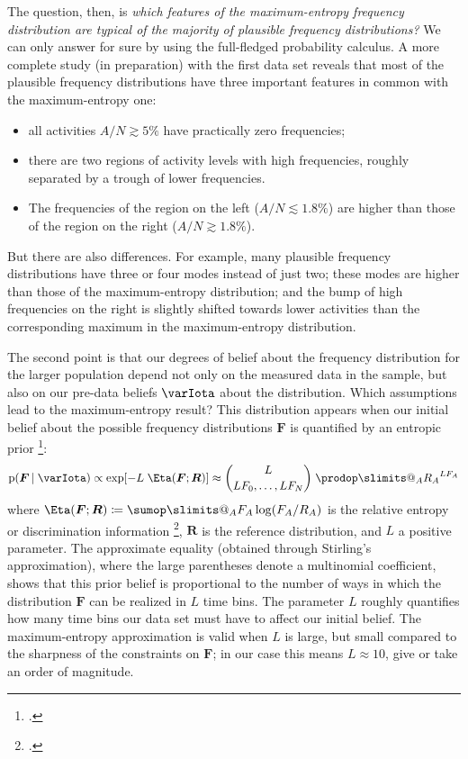 \documentclass[\ifafour a4paper,12pt,\else a5paper,10pt,\fi%
onecolumn,oneside,article,%
british%
]{memoir}
\makeatletter
\theoremstyle{remark}
\theoremstyle{innote}
\def\sum{\DOTSI\sumop\slimits@}
\def\prod{\DOTSI\prodop\slimits@}
\newcommand*{\citep}{\footcites}
\newcommand*{\defd}{\coloneqq}
\newcommand*{\pf}{\mathrm{p}}%
\renewcommand*{\|}{\nonscript\,\vert\nonscript\;\mathopen{}}
\newcommand*{\yAv}{A}
\newcommand*{\yFF}{F}
\newcommand*{\yF}{\bm{\yFF}}
\newcommand*{\yA}{\yAv}%
\newcommand*{\yI}{\varIota}
\newcommand*{\re}{\Eta}
\newcommand*{\yRR}{R}
\newcommand*{\yR}{\bm{\yRR}}
\newcommand*{\yL}{L}
\makeatother
\begin{document}
The question, then, is \emph{which features of the maximum-entropy
  frequency distribution are typical of the majority of plausible frequency
  distributions?} We can only answer for sure by using the full-fledged
probability calculus. A more complete study (in preparation) with the first
data set reveals that most of the plausible frequency distributions have
three important features in common with the maximum-entropy one:
\begin{itemize}
\item all activities $\yA/N \gtrsim 5\%$ have practically zero frequencies;
\item there are two regions of activity levels with high frequencies,
  roughly separated by a trough of lower frequencies.
\item The frequencies of the region on the left ($\yA/N \lesssim 1.8\%$)
  are higher than those of the region on the right ($\yA/N \gtrsim 1.8\%$).
\end{itemize}
But there are also differences. For example, many plausible frequency
distributions have three or four modes instead of just two; these modes are
higher than those of the maximum-entropy distribution; and the bump of high
frequencies on the right is slightly shifted towards lower activities than
the corresponding maximum in the maximum-entropy distribution.

\medskip

The second point is that our degrees of belief about the frequency
distribution for the larger population depend not only on the measured data in
the sample, but also on our pre-data beliefs $\yI$ about the distribution.
Which assumptions lead to the maximum-entropy result? This distribution
appears when our initial belief about the possible frequency distributions
$\yF$ is quantified by an entropic prior
\citep{neumann2007,rodriguez1991,skilling1998,catichaetal2004,portamana2017}:
\begin{equation}
  \label{eq:entropic_prior}
  \pf(\yF \| \yI) \propto  \exp[-\yL\;\re(\yF;\yR)]
  \approx \binom{L}{L\yFF_{0}, \dotsc, L\yFF_{N}}\;
  \prod_{\yA}{\yRR_{\yA}}^{L\yFF_{\yA}}
\end{equation}
where $\re(\yF;\yR)\defd \sum_{\yA}\yFF_{\yA}\log(\yFF_{\yA}/\yRR_{\yA})$ is
the relative entropy or discrimination information
\citep{kullback1987,jaynes1963,hobson1969,hobsonetal1973}, $\yR$ is the
reference distribution, and $\yL$ a positive parameter. The approximate
equality (obtained through Stirling's approximation), where the large
parentheses denote a multinomial coefficient, shows that this prior belief
is proportional to the number of ways in which the distribution $\yF$ can
be realized in $L$ time bins. The parameter $L$ roughly quantifies how many
time bins our data set must have to affect our initial belief. The
maximum-entropy approximation is valid when $L$ is large, but small
compared to the sharpness of the constraints on $\yF$; in our case this
means $\yL \approx 10$, give or take an order of magnitude.
\end{document}
